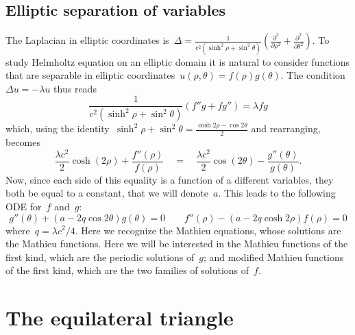\subsection{Elliptic separation of variables}

The Laplacian in elliptic coordinates
is~$\displaystyle\Delta=
\frac1{c^2\left(\sinh^2\rho+\sin^2\theta\right)}
\left(
	\frac{\partial^2}{\partial\rho^2}
	+
	\frac{\partial^2}{\partial\theta^2}
\right)
$.
To study Helmholtz equation on an elliptic domain it is natural to
consider functions that are separable in elliptic
coordinates~$u(\rho,\theta)=f(\rho)g(\theta)$.  The condition~$\Delta
u=-\lambda u$ thus reads
\[
\frac1{c^2\left(\sinh^2\rho+\sin^2\theta\right)}
\left(f''g+fg''\right)
=\lambda fg
\]
which, using the
identity~$\sinh^2\rho+\sin^2\theta=\frac{\cosh{2\rho}-\cos{2\theta}}2$
and
rearranging, becomes
\[
	\frac{\lambda c^2}2\cosh(2\rho)
	+
	\frac{f''(\rho)}{f(\rho)}
	\quad = \quad
	\frac{\lambda c^2}2\cos(2\theta)
	-\frac{g''(\theta)}{g(\theta)}.
\]
Now,
since each side of this equality is a function of a different
variables, they both be equal to a constant, that we will denote~$a$.
This leads to the following ODE for~$f$ and~$g$:
\begin{equation}\label{eq:mathieuell}
	g''(\theta)+\left(a-2q\cos2\theta\right)g(\theta)=0
	\qquad
	f''(\rho)-\left(a-2q\cosh2\rho\right)f(\rho)=0
\end{equation}
where~$q=\lambda c^2/4$.  Here we recognize the Mathieu
equations, whose solutions are the Mathieu functions.  Here we will
be interested in the Mathieu functions of the first kind, which are
the periodic solutions of~$g$; and modified Mathieu functions of the
first kind, which are the two families of solutions of~$f$.



\section{The equilateral triangle}


